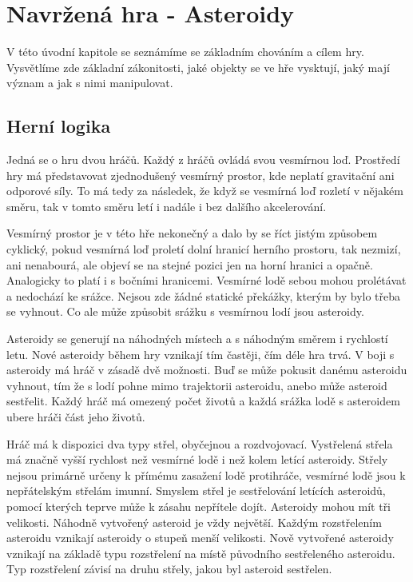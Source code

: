 \chapter{Navržená hra - Asteroidy}
V této úvodní kapitole se seznámíme se základním chováním a cílem hry. 
Vysvětlíme zde základní zákonitosti, jaké objekty se ve hře vysktují, jaký mají význam a jak s nimi manipulovat.

\section{Herní logika}
Jedná se o hru dvou hráčů. 
Každý z hráčů ovládá svou vesmírnou loď.
Prostředí hry má představovat zjednodušený vesmírný prostor, kde neplatí gravitační ani odporové síly.
To má tedy za následek, že když se vesmírná loď rozletí v nějakém směru, tak v tomto směru letí i nadále i bez dalšího akcelerování.
\par
\label{HraniceProsotru}
Vesmírný prostor je v této hře nekonečný a dalo by se říct jistým způsobem cyklický, pokud vesmírná loď proletí dolní hranicí herního prostoru, tak nezmizí, ani nenabourá, ale objeví se na stejné pozici jen na horní hranici a opačně. Analogicky to platí i s bočními hranicemi.
Vesmírné lodě sebou mohou prolétávat a nedochází ke srážce.
Nejsou zde žádné statické překážky, kterým by bylo třeba se vyhnout. Co ale může způsobit srážku s vesmírnou lodí jsou asteroidy.    
\par
Asteroidy se generují na náhodných místech a s náhodným směrem i rychlostí letu. Nové asteroidy během hry vznikají tím častěji, čím déle hra trvá.
V boji s asteroidy má hráč v zásadě dvě možnosti. Buď se může pokusit danému asteroidu vyhnout, tím že s lodí pohne mimo trajektorii asteroidu, anebo může asteroid sestřelit.
Každý hráč má omezený počet životů a každá srážka lodě s asteroidem ubere hráči část jeho životů.
\par
Hráč má k dispozici dva typy střel, obyčejnou a rozdvojovací. Vystřelená střela má značně vyšší rychlost než vesmírné lodě i než kolem letící asteroidy.
Střely nejsou primárně určeny k přímému zasažení lodě protihráče, vesmírné lodě jsou k nepřátelským střelám imunní.
Smyslem střel je sestřelování letících asteroidů, pomocí kterých teprve může k zásahu nepřítele dojít. Asteroidy mohou mít tři velikosti. Náhodně vytvořený asteroid je vždy největší. Každým rozstřelením asteroidu vznikají asteroidy o stupeň menší velikosti.
Nově vytvořené asteroidy vznikají na základě typu rozstřelení na místě původního sestřeleného asteroidu. Typ rozstřelení závisí na druhu střely, jakou byl asteroid sestřelen. 
